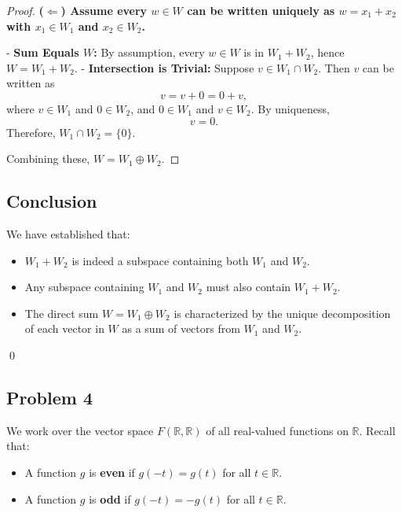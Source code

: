 \documentclass[12pt]{article}
\begin{document}
\begin{enumerate}[label=(\alph*)]
\begin{proof}
        \textbf{(\(\Leftarrow\)) Assume every \( w \in W \) can be written uniquely as \( w = x_1 + x_2 \) with \( x_1 \in W_1 \) and \( x_2 \in W_2 \).}
        
        - \textbf{Sum Equals \( W \):} By assumption, every \( w \in W \) is in \( W_1 + W_2 \), hence \( W = W_1 + W_2 \).
        - \textbf{Intersection is Trivial:} Suppose \( v \in W_1 \cap W_2 \). Then \( v \) can be written as
            \[
            v = v + 0 = 0 + v,
            \]
            where \( v \in W_1 \) and \( 0 \in W_2 \), and \( 0 \in W_1 \) and \( v \in W_2 \). By uniqueness,
            \[
            v = 0.
            \]
            Therefore, \( W_1 \cap W_2 = \{0\} \).
        
        Combining these, \( W = W_1 \oplus W_2 \).
    \end{proof}
\end{enumerate}

\subsection*{Conclusion}

We have established that:
\begin{itemize}
    \item \( W_1 + W_2 \) is indeed a subspace containing both \( W_1 \) and \( W_2 \).
    \item Any subspace containing \( W_1 \) and \( W_2 \) must also contain \( W_1 + W_2 \).
    \item The direct sum \( W = W_1 \oplus W_2 \) is characterized by the unique decomposition of each vector in \( W \) as a sum of vectors from \( W_1 \) and \( W_2 \).
\end{itemize}
\qed

\newpage

\subsection*{Problem 4}

We work over the vector space \(F(\mathbb{R}, \mathbb{R})\) of all real-valued functions on \(\mathbb{R}\). Recall that:
\begin{itemize}
    \item A function \(g\) is \textbf{even} if \(g(-t) = g(t)\) for all \(t \in \mathbb{R}\).
    \item A function \(g\) is \textbf{odd} if \(g(-t) = -g(t)\) for all \(t \in \mathbb{R}\).
\end{itemize}
\end{document}
